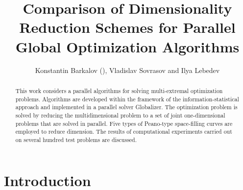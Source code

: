 \documentclass[runningheads]{llncs}
\begin{document}
\setlength{\abovedisplayskip}{3pt}
\setlength{\belowdisplayskip}{3pt}
%
\title{Comparison of Dimensionality Reduction Schemes for Parallel Global Optimization
Algorithms}
%
%
\author{Konstantin Barkalov (\Letter),
Vladislav Sovrasov and
Ilya Lebedev}
%
%
%
\maketitle              %
%
\begin{abstract}
This work considers a parallel algorithms for solving multi-extremal optimization problems.
Algorithms are developed within the framework of the information-statistical approach and
implemented in a parallel solver Globalizer. The optimization problem is solved by reducing
the multidimensional problem to a set of joint one-dimensional problems that are solved in
parallel. Five types of Peano-type space-filling curves are employed to reduce dimension. The
results of computational experiments carried out on several hundred test problems are discussed.

\end{abstract}

\section{Introduction}\label{sec:intro}
\end{document}
